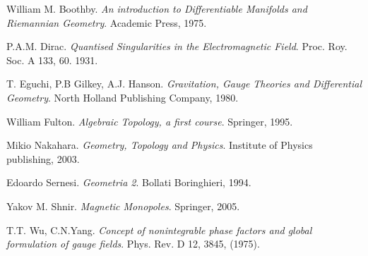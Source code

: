 \begin{thebibliography}{9}

William M. Boothby.
\textit{An introduction to Differentiable Manifolds and Riemannian Geometry}.
Academic Press, 1975.

P.A.M. Dirac.
\textit{Quantised Singularities in the Electromagnetic Field}.
Proc. Roy. Soc. A 133, 60. 1931.

T. Eguchi, P.B Gilkey, A.J. Hanson.
\textit{Gravitation, Gauge Theories and Differential Geometry}.
North Holland Publishing Company, 1980.

  William Fulton.
  \textit{Algebraic Topology, a first course}.
  Springer, 1995.

   Mikio Nakahara.
   \textit{Geometry, Topology and Physics}.
   Institute of Physics publishing, 2003.

   Edoardo Sernesi.
   \textit{Geometria 2}.
   Bollati Boringhieri, 1994.

  Yakov M. Shnir.
  \textit{Magnetic Monopoles}.
  Springer, 2005.

   T.T. Wu, C.N.Yang.
   \textit{Concept of nonintegrable phase factors and global formulation of gauge fields}.
   Phys. Rev. D 12, 3845, (1975).



\end{thebibliography}
